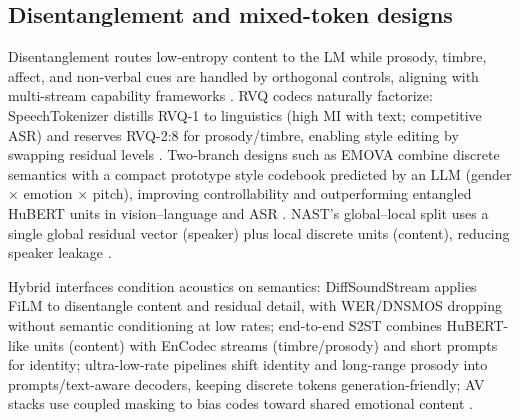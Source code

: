 \documentclass{article}
\begin{document}
\subsection{Disentanglement and mixed-token designs} \label{subsec:Disentanglement and mixed-token designs}
Disentanglement routes low-entropy content to the LM while prosody, timbre, affect, and non-verbal cues are handled by orthogonal controls, aligning with multi-stream capability frameworks \cite{wang2025bossbeyondsemanticspeech,guo2025recentadvancesdiscretespeechtokensreview}. RVQ codecs naturally factorize: SpeechTokenizer distills RVQ-1 to linguistics (high MI with text; competitive ASR) and reserves RVQ-2:8 for prosody/timbre, enabling style editing by swapping residual levels \cite{zhang2024speechtokenizerunifiedspeechtokenizerlar}. Two-branch designs such as EMOVA combine discrete semantics with a compact prototype style codebook predicted by an LLM (gender $\times$ emotion $\times$ pitch), improving controllability and outperforming entangled HuBERT units in vision--language and ASR \cite{chen2025emovaempoweringlanguagemodelsseehearspea}. NAST's global--local split uses a single global residual vector (speaker) plus local discrete units (content), reducing speaker leakage \cite{messica2024nastnoiseawarespeechtokenizationlanguage}.

Hybrid interfaces condition acoustics on semantics: DiffSoundStream applies FiLM to disentangle content and residual detail, with WER/DNSMOS dropping without semantic conditioning at low rates; end-to-end S2ST combines HuBERT-like units (content) with EnCodec streams (timbre/prosody) and short prompts for identity; ultra-low-rate pipelines shift identity and long-range prosody into prompts/text-aware decoders, keeping discrete tokens generation-friendly; AV stacks use coupled masking to bias codes toward shared emotional content \cite{yang2025diffsoundstreamefficientspeechtokenizati,peng2024mslms2stmultitaskspeechlanguagemodeltext,wang2025tadicodectextawarediffusionspeechtokeniz,sadok2025vectorquantizedmaskedautoencoderaudiovis}.
\end{document}
